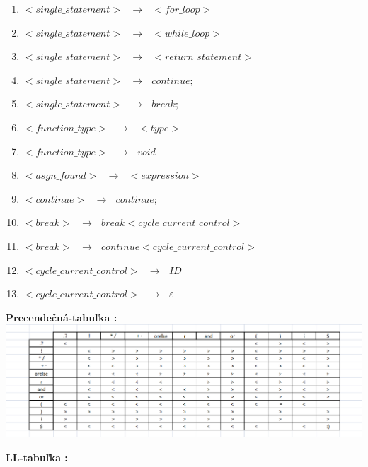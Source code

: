 \documentclass[12pt]{article}
\begin{document}
\begin{enumerate}
\item $ <single\_statement> \text{ }\to \text{ } <for\_loop>$
\item $<single\_statement> \text{ }\to \text{ } <while\_loop>$
\item $<single\_statement> \text{ }\to \text{ } <return\_statement>$
\item $<single\_statement> \text{ }\to \text{ }  continue ;$
\item $<single\_statement> \text{ }\to \text{ }  break ;$
\item $<function\_type> \text{ }\to \text{ } <type>$
\item $<function\_type> \text{ }\to \text{ } void$
\item $<asgn\_found> \text{ }\to \text{ } <expression> $
\item $<continue> \text{ }\to \text{ } continue ;$
\item $<break> \text{ }\to \text{ } break <cycle\_current\_control>$
\item $<break> \text{ }\to \text{ } continue <cycle\_current\_control>$
\item $<cycle\_current\_control> \text{ }\to \text{ } ID$
\item $<cycle\_current\_control> \text{ }\to \text{ } \varepsilon$

\end{enumerate}

\Large \textbf{Precendečná-tabuľka :}
\newline \\

\includegraphics[width=\textwidth,scale=0.3]{Ptabulka}

\newpage

 \Large \textbf{LL-tabuľka :}
\newline \\
\end{document}
